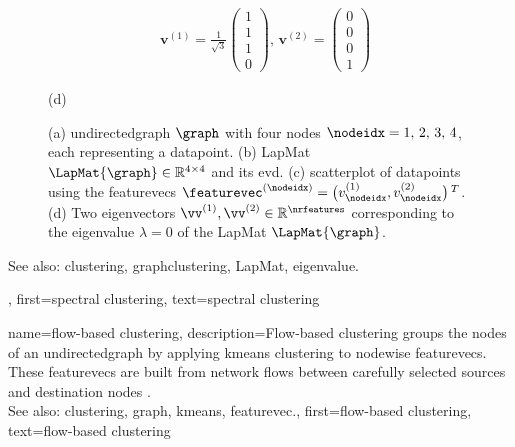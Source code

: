 {{\begin{figure}[H]
\begin{center}
\begin{minipage}{0.4\textwidth}
\begin{align}
					&	\mathbf{v}^{(1)}\!=\!\frac{1}{\sqrt{3}} \begin{pmatrix} 1 \\ 1 \\ 1 \\ 0 \end{pmatrix}, \,
					\mathbf{v}^{(2)}\!=\!\begin{pmatrix} 0 \\ 0 \\ 0 \\ 1 \end{pmatrix} \nonumber 
					\end{align}
					\begin{minipage}{\textwidth}
						\vspace{3ex}
						\centering
						{\selectfont (d)}
					\end{minipage}
				\end{minipage} 
		\caption{\label{fig_lap_mtx_specclustering_dict} (a) \Gls{undirectedgraph} 
			$\graph$ with four nodes $\nodeidx=1,\,2,\,3,\,4$, each representing a \gls{datapoint}. (b) \gls{LapMat} 
			$\LapMat{\graph} \in \mathbb{R}^{4 \times 4}$ and its \gls{evd}. 
			(c) \Gls{scatterplot} of \glspl{datapoint} using the \glspl{featurevec} 
			$\featurevec^{(\nodeidx)} = \big( v^{(1)}_{\nodeidx},v^{(2)}_{\nodeidx} \big)\,^{T}$. 
			(d) Two \glspl{eigenvector} $\vv^{(1)},\vv^{(2)} \in \mathbb{R}^{\nrfeatures}$ 
			corresponding to the \gls{eigenvalue} $\lambda=0$ of the \gls{LapMat} $\LapMat{\graph}$. } 
			\end{center}
		\end{figure}
		See also: \gls{clustering}, \gls{graphclustering}, \gls{LapMat}, \gls{eigenvalue}.}, 
	first={spectral clustering},
	text={spectral clustering} 
}

{name={flow-based clustering},
	description={Flow-based \gls{clustering} groups the nodes 
		of an \gls{undirectedgraph} by applying \gls{kmeans} \gls{clustering} to nodewise 
		\glspl{featurevec}. These \glspl{featurevec} are built from network flows between 
		carefully selected sources and destination nodes \cite{FlowSpecClustering2021}. 
					\\ 
		See also: \gls{clustering}, \gls{graph}, \gls{kmeans}, \gls{featurevec}.}, 
	first={flow-based clustering},
	text={flow-based clustering} 
}

